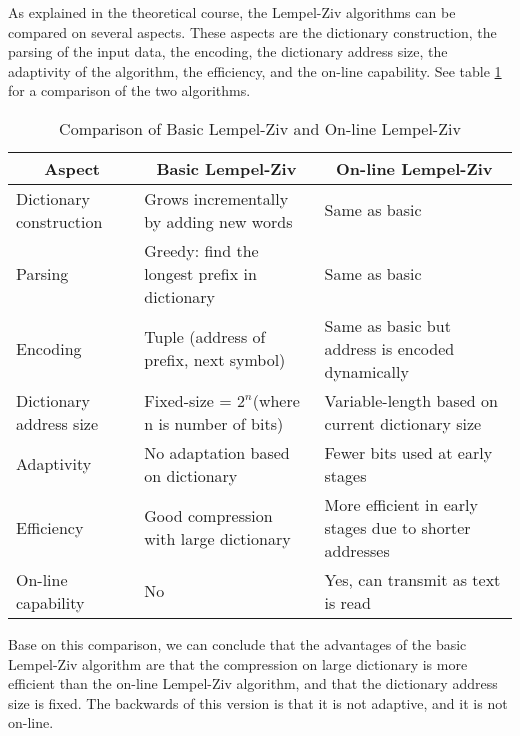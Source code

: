 \documentclass[]{template}
\begin{document}
    As explained in the theoretical course, the Lempel-Ziv algorithms can be compared on several aspects. These aspects are the dictionary construction,
    the parsing of the input data, the encoding, the dictionary address size, the adaptivity of the algorithm, the efficiency, and the on-line capability.
    See table \ref{tab:basic_vs_online} for a comparison of the two algorithms.\\
    \begin{table}[ht]
        \centering
        \setlength{\tabcolsep}{6pt}
        \begin{tabular}{|p{3cm}|p{5cm}|p{5cm}|}
            \hline
            \multicolumn{1}{|c|}{Aspect} & \multicolumn{1}{c|}{Basic Lempel-Ziv} & \multicolumn{1}{c|}{On-line Lempel-Ziv} \\ \hline
            Dictionary construction      & Grows incrementally by adding new words & Same as basic \\ \hline
            Parsing                      & Greedy: find the longest prefix in dictionary & Same as basic \\ \hline
            Encoding                     & Tuple (address of prefix, next symbol) & Same as basic but address is encoded dynamically \\ \hline
            Dictionary address size      & Fixed-size = $2^n$\newline (where n is number of bits) & Variable-length based on current dictionary size \\ \hline
            Adaptivity                   & No adaptation based on dictionary & Fewer bits used at early stages \\ \hline
            Efficiency                   & Good compression with large dictionary & More efficient in early stages due to shorter addresses \\ \hline
            On-line capability           & No & Yes, can transmit as text is read \\ \hline
        \end{tabular}
        \caption{Comparison of Basic Lempel-Ziv and On-line Lempel-Ziv}\label{tab:basic_vs_online}
    \end{table}

    \noindent
    Base on this comparison, we can conclude that the advantages of the basic Lempel-Ziv algorithm are that the compression on large dictionary is 
    more efficient than the on-line Lempel-Ziv algorithm, and that the dictionary address size is fixed. 
    The backwards of this version is that it is not adaptive, and it is not on-line.\\
\end{document}
